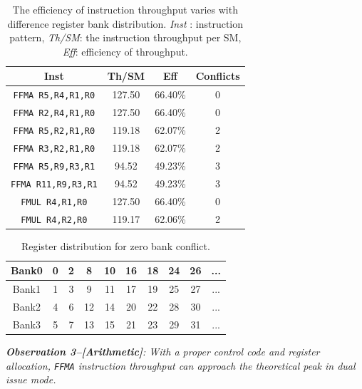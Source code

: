 \documentclass{sig-alternate-05-2015}
\begin{document}
\begin{table}[htbp]
\caption{The efficiency of instruction throughput varies with difference register bank distribution. {\it Inst} : instruction pattern, {\it Th/SM}: the instruction throughput per SM, {\it Eff}: efficiency of throughput.}
\centering
\scalebox{1.0} {
\begin{tabular}{|c||c|c|c|}
\hline
Inst &Th/SM&Eff&Conflicts \\
\hline
{\tt FFMA R5,R4,R1,R0}&127.50&66.40\%&0\\
\hline
{\tt FFMA R2,R4,R1,R0}&127.50&66.40\%&0\\
\hline
{\tt FFMA R5,R2,R1,R0}&119.18&62.07\%&2\\
\hline
{\tt FFMA R3,R2,R1,R0}&119.18&62.07\%&2\\
\hline
{\tt FFMA R5,R9,R3,R1}&94.52&49.23\%&3\\
\hline
{\tt FFMA R11,R9,R3,R1}&94.52&49.23\%&3\\
\hline
{\tt FMUL R4,R1,R0}&127.50&66.40\%&0\\
\hline
{\tt FMUL R4,R2,R0}&119.17&62.06\%&2\\
\hline
\end{tabular}
}
\label{tab:th}
\end{table}


\begin{table}[htbp]
\caption{Register distribution for zero bank conflict.}
\centering
\scalebox{1.0} {
\begin{tabular}{|c||c|c|c|c|c|c|c|c|c|}
\hline
Bank0&0&2&8&10&16&18&24&26&... \\
\hline
Bank1&1&3&9&11&17&19&25&27&... \\
\hline
Bank2&4&6&12&14&20&22&28&30&... \\
\hline
Bank3&5&7&13&15&21&23&29&31&...\\
\hline
\end{tabular}
}
\label{tab:reg}
\end{table}

{\em {\bf Observation 3--[Arithmetic]}: With a proper control code and register allocation, {\tt FFMA} instruction throughput can approach the theoretical peak in dual issue mode.}
\end{document}
